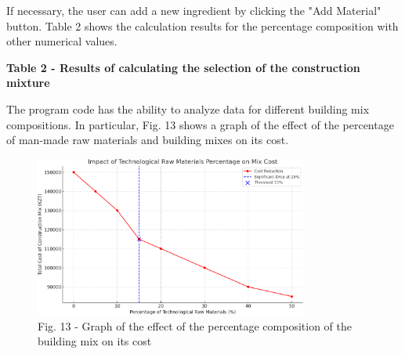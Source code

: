 If necessary, the user can add a new ingredient by clicking the "Add
Material" button. Table 2 shows the calculation results for the
percentage composition with other numerical values.

{\bfseries Table 2 - Results of calculating the selection of the construction mixture}


The program code has the ability to analyze data for different building
mix compositions. In particular, Fig. 13 shows a graph of the effect of
the percentage of man-made raw materials and building mixes on its cost.

\begin{figure}[H]
	\centering
	\includegraphics[width=0.8\textwidth]{media/ict3/image14}
	\caption*{Fig. 13 - Graph of the effect of the percentage composition of the building mix on its cost}
\end{figure}

